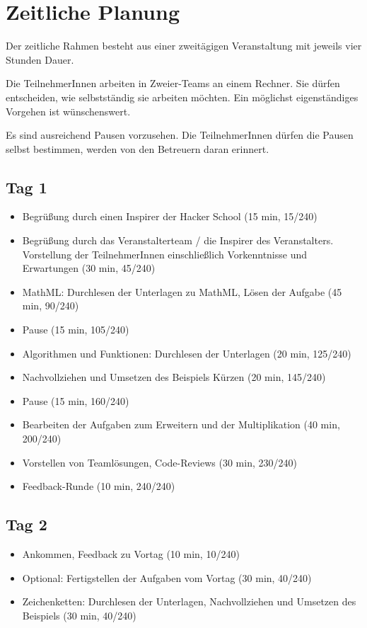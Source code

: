 \section{Zeitliche Planung}

Der zeitliche Rahmen besteht aus einer zweitägigen Veranstaltung mit jeweils vier Stunden Dauer.

Die TeilnehmerInnen arbeiten in Zweier-Teams an einem Rechner. Sie dürfen entscheiden, wie selbstständig sie arbeiten möchten. Ein möglichst eigenständiges Vorgehen ist wünschenswert.

Es sind ausreichend Pausen vorzusehen. Die TeilnehmerInnen dürfen die Pausen selbst bestimmen, werden von den Betreuern daran erinnert.

\subsection*{Tag 1}

\begin{itemize}
	\item Begrüßung durch einen Inspirer der Hacker School (15 min, 15/240)
	\item Begrüßung durch das Veranstalterteam / die Inspirer des Veranstalters. Vorstellung der TeilnehmerInnen einschließlich Vorkenntnisse und Erwartungen (30 min, 45/240)
	\item MathML: Durchlesen der Unterlagen zu MathML, Lösen der Aufgabe (45 min, 90/240)
	\item Pause (15 min, 105/240)
	\item Algorithmen und Funktionen: Durchlesen der Unterlagen (20 min, 125/240)
	\item Nachvollziehen und Umsetzen des Beispiels Kürzen (20 min, 145/240)
	\item Pause (15 min, 160/240)
	\item Bearbeiten der Aufgaben zum Erweitern und der Multiplikation (40 min, 200/240)
	\item Vorstellen von Teamlösungen, Code-Reviews (30 min, 230/240)
	\item Feedback-Runde (10 min, 240/240)
\end{itemize}

\subsection*{Tag 2}

\begin{itemize}
	\item Ankommen, Feedback zu Vortag (10 min, 10/240)
	\item Optional: Fertigstellen der Aufgaben vom Vortag (30 min, 40/240)
	\item Zeichenketten: Durchlesen der Unterlagen, Nachvollziehen und Umsetzen des Beispiels (30 min, 40/240)
	
\end{itemize}